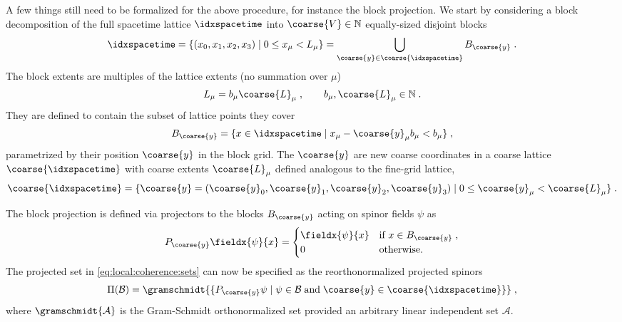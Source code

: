 A few things still need to be formalized for the above procedure, for instance the block projection.
We start by considering a block decomposition of the full spacetime lattice $\idxspacetime$ into $\coarse{V} \in \mathbb{N}$ equally-sized disjoint blocks
\begin{equation} \label{eq:coarse:lattice}
\idxspacetime
= \{ (x_0,x_1,x_2,x_3) \mid 0 \leq x_{\mu} < L_{\mu} \}
= \bigcup_{\coarse{y} \in \coarse{\idxspacetime}} B_{\coarse{y}} \;.
\end{equation}
The block extents are multiples of the lattice extents (no summation over $\mu$)
\begin{equation}
L_{\mu} = b_{\mu} \coarse{L}_{\mu} \;,
\qquad
b_{\mu}, \coarse{L}_{\mu} \in \mathbb{N} \;.
\end{equation}
They are defined to contain the subset of lattice points they cover
\begin{equation}
B_{\coarse{y}} = \{ x \in \idxspacetime \mid x_{\mu} - \coarse{y}_{\mu} b_{\mu} < b_{\mu} \} \;,
\end{equation}
parametrized by their position $\coarse{y}$ in the block grid.
The $\coarse{y}$ are new coarse coordinates in a coarse lattice $\coarse{\idxspacetime}$ with coarse extents $\coarse{L}_{\mu}$ defined analogous to the fine-grid lattice,
\begin{equation}
\coarse{\idxspacetime} = \{ \coarse{y} = (\coarse{y}_0, \coarse{y}_1, \coarse{y}_2, \coarse{y}_3) \mid 0 \leq \coarse{y}_\mu < \coarse{L}_\mu\} \;.
\end{equation}

The block projection is defined via projectors to the blocks $B_{\coarse{y}}$ acting on spinor fields $\psi$ as
\begin{equation}
P_{\coarse{y}} \fieldx{\psi}{x} =
\begin{cases}
\fieldx{\psi}{x} & \text{if } x \in B_{\coarse{y}} \;, \\
0 & \text{otherwise.}
\end{cases}
\end{equation}
The projected set in \cref{eq:local:coherence:sets} can now be specified as the reorthonormalized projected spinors
\begin{equation}
\Pi(\mathcal{B}) = \gramschmidt{ \{ P_{\coarse{y}}\psi \mid \psi \in \mathcal{B} \; \text{and} \; \coarse{y} \in \coarse{\idxspacetime} \} } \;,
\end{equation}
where $\gramschmidt{\mathcal{A}}$ is the Gram-Schmidt orthonormalized set provided an arbitrary linear independent set $\mathcal{A}$.

